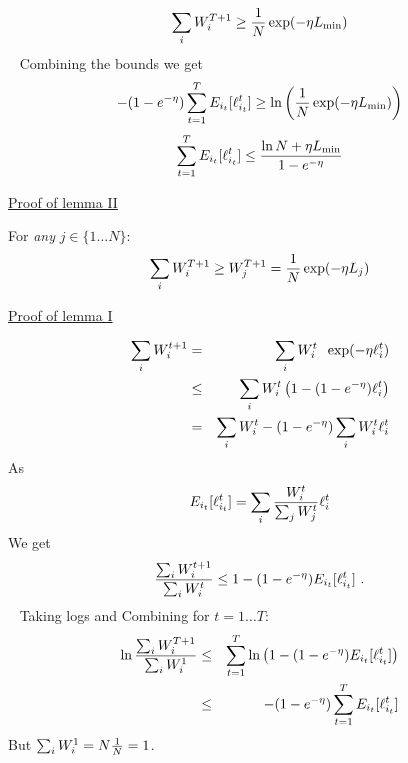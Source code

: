 \begin{flushleft}
\begin{LARGE}
\[
\sum_i W_{i}^{T+1} 
 \geq {1 \over N} \exp (-\eta L_{\min})
\]
~\newline
Combining the bounds we get
\[
- (1-e^{-\eta})
	\sum_{t=1}^T E_{i_t} [\ell_{i_t}^{t}]
\geq \ln \left({1 \over N} \exp (-\eta L_{\min}) \right)
\]
\[
\sum_{t=1}^T E_{i_t} [\ell_{i_t}^{t}]
\leq
{ \ln N + \eta L_{\min}\over 1-e^{-\eta}}
\]

\pagebreak

\begin{center}
\underline{Proof of lemma II}
\end{center}

For {\em any} $j \in \{1\ldots N\}$:
\[
\sum_i W_{i}^{T+1} \geq W_{j}^{T+1} 
= {1 \over N} \exp (-\eta L_{j})
\]

\pagebreak

\begin{center}
\underline{Proof of lemma I}
\end{center}

\begin{eqnarray*}
\sum_i W_{i}^{t+1} 
&=& \sum_i W_{i}^{t} \;\; \exp (-\eta \ell_{i}^{t}) \\
&\leq& \sum_i W_{i}^{t} \left(1-(1-e^{-\eta})\ell_{i}^{t}
\right) \\
&=&
\sum_i W_{i}^{t} 
-
(1-e^{-\eta}) \sum_i W_{i}^{t} \ell_{i}^{t}
\end{eqnarray*}
As
\[
E_{i_t} [\ell_{i_t}^{t}] = \sum_i 
{W_{i}^{t} \over \sum_j W_{j}^{t}} \ell_{i}^{t}
\]
We get
\[
{\sum_i W_{i}^{t+1} \over \sum_i W_{i}^{t} }
\leq 1 - (1-e^{-\eta}) E_{i_t} [\ell_{i_t}^{t}]~.
\]
~\newline
Taking logs and Combining for $t=1\ldots T$:
\begin{eqnarray*}
\ln {\sum_i W_{i}^{T+1} \over \sum_i W_{i}^{1}}
&\leq & \sum_{t=1}^T 
     \ln \left(1-(1-e^{-\eta}) E_{i_t} [\ell_{i_t}^{t}] \right) \\
&\leq &
     - (1-e^{-\eta})
	\sum_{t=1}^T E_{i_t} [\ell_{i_t}^{t}]
\end{eqnarray*}
But $\sum_i W_{i}^{1} = N {1 \over N} = 1$.\newline

\pagebreak


\end{LARGE}
\end{flushleft}
